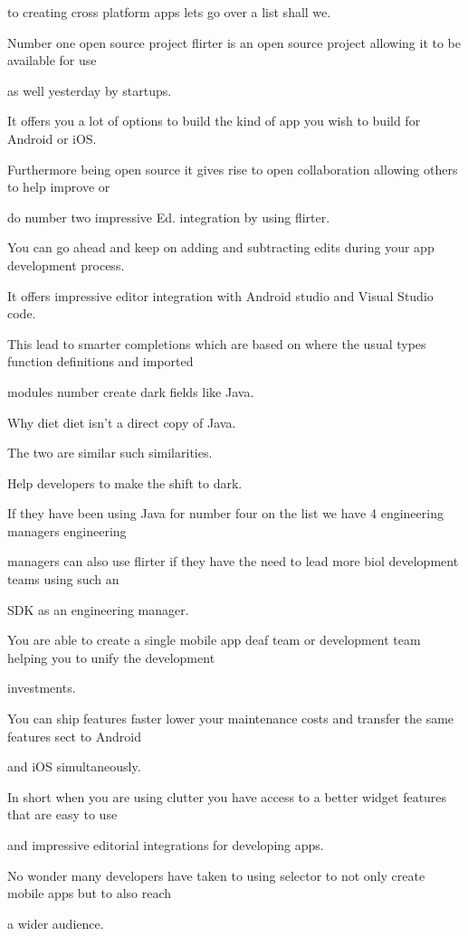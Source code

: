 to creating cross platform apps lets go over a list shall we.

Number one open source project flirter is an open source project allowing it to be available for use

as well yesterday by startups.

It offers you a lot of options to build the kind of app you wish to build for Android or iOS.

Furthermore being open source it gives rise to open collaboration allowing others to help improve or

do number two impressive Ed. integration by using flirter.

You can go ahead and keep on adding and subtracting edits during your app development process.

It offers impressive editor integration with Android studio and Visual Studio code.

This lead to smarter completions which are based on where the usual types function definitions and imported

modules number create dark fields like Java.

Why diet diet isn't a direct copy of Java.

The two are similar such similarities.

Help developers to make the shift to dark.

If they have been using Java for number four on the list we have 4 engineering managers engineering

managers can also use flirter if they have the need to lead more biol development teams using such an

SDK as an engineering manager.

You are able to create a single mobile app deaf team or development team helping you to unify the development

investments.

You can ship features faster lower your maintenance costs and transfer the same features sect to Android

and iOS simultaneously.

In short when you are using clutter you have access to a better widget features that are easy to use

and impressive editorial integrations for developing apps.

No wonder many developers have taken to using selector to not only create mobile apps but to also reach

a wider audience.

